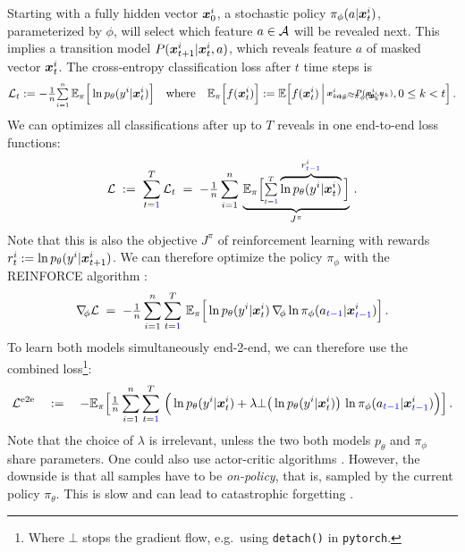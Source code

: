 Starting with a fully hidden vector $\bm x^i_0$, 
a stochastic policy $\pi_\phi(a|\bm x^i_t)$, parameterized by $\phi$,
will select which feature $a \in \mathcal{A}$ will be revealed next.
This implies a transition model $P(\bm x^i_{t+1}|\bm x^i_{t}, a)$, 
which reveals feature $a$ of masked vector $\bm x^i_t$.
The cross-entropy classification loss after $t$ time steps is
\begin{align}
	\Set L_t := -\smallfrac{1}{n} \smallsum{i=1}{n}\,  
	\E_\pi\Big[ \ln p_\theta(y^i|\ve x^i_t) \Big]
	\quad \text{where} \quad
	\E_\pi\Big[f(\ve x^i_t)\Big] := \E\Big[ f(\ve x^i_t) \,\Big|
		\stack{
		a_k \sim \pi_\phi(\ve x_k^i)
		\brs[-5mm]
		\ve x^i_{k+1} \sim P(\ve x^i_k, a_k)
		}\!, 0 \leq k < t
	\Big] \,.
\end{align}
We can optimizes all classifications after up to $T$ reveals 
in one end-to-end loss functions:
\begin{align}
	\mathcal{L} \;:=\; \sum_{t={\color{blue}1}}^T \mathcal{L}_t \;=\; 
	-{\textstyle \frac{1}{n}} \sum_{i=1}^{n}\,  
	\underbrace{\mathbb{E}_\pi\Big[ {\textstyle \sum\limits_{\scriptscriptstyle t={\color{blue}1}}^{\scriptscriptstyle T}} 
		\overbrace{\ln p_\theta(y^i| \bm x^i_t)}^{r^i_{\color{blue}t-1}} 
	\Big]}_{J^\pi} \,.
\end{align}
Note that this is also the objective $J^\pi$ of reinforcement learning
with rewards $r^i_t := \ln p_\theta(y^i|\bm x^i_{t+1})$.
We can therefore optimize the policy $\pi_\phi$
with the REINFORCE algorithm \citep{Williams92}:
\begin{align}
	\nabla\kern-0.5ex_{\phi} \mathcal{L} \;=\; 
	-{\textstyle \frac{1}{n}} \sum_{i=1}^{n} \sum_{t={\color{blue}1}}^{T}\,  
	\mathbb{E}_\pi\Big[ 
		\ln p_\theta(y^i| \bm x^i_t)  \,
		\nabla\kern-0.5ex_{\phi} \ln \pi_\phi(a_{\color{blue}t-1}| \bm x^i_{\color{blue}t-1}) \Big] \,.
\end{align}
To learn both models simultaneously end-2-end, we can therefore use the 
combined loss\footnote{Where $\bot$ stops the gradient flow,
	e.g.~using \texttt{detach()} in \texttt{pytorch}.}:
\begin{align}
	\mathcal{L}^\text{e2e} \quad:=\quad
	- \mathbb{E}_\pi\Big[
	{\textstyle \frac{1}{n}} \sum_{i=1}^{n} \sum_{t={\color{blue}1}}^{T}\,  \Big(
	 \ln p_\theta(y^i| \bm x^i_t) 
	+ \lambda \bot\big(\ln p_\theta(y^i| \bm x^i_t)\big)  \,
		\ln \pi_\phi(a_{\color{blue}t-1}| \bm x^i_{\color{blue}t-1}) \Big) \Big]\,.	
\end{align}
Note that the choice of $\lambda$ is irrelevant, 
unless the two both models $p_\theta$ and $\pi_\phi$ share parameters.
One could also use actor-critic algorithms \citep{Sutton00}.
However, the downside is that all samples have to be 
{\em on-policy}, that is, sampled by the current policy $\pi_\theta$.
This is slow and can lead to catastrophic forgetting
\citep[which can be counteracted by modern 
algorithms,][but this is another story]{Schulman15, Schulman17}.


